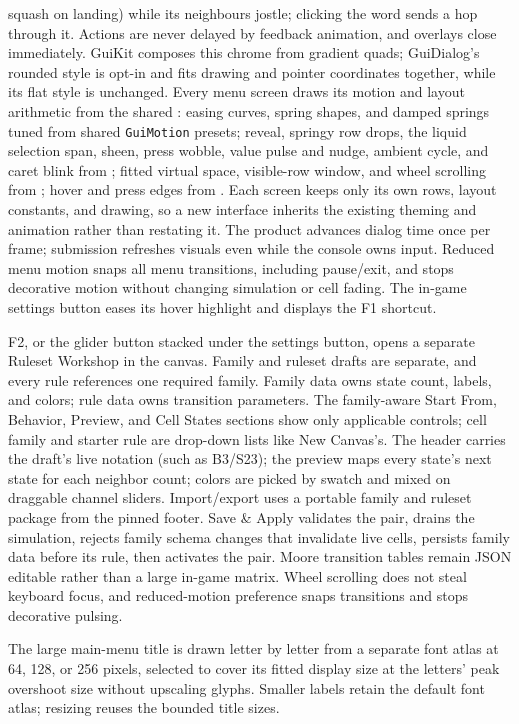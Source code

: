squash on landing) while its neighbours jostle; clicking the word sends a hop
through it.
Actions are never delayed by feedback animation, and overlays close
immediately. GuiKit composes this chrome from  gradient
quads; GuiDialog's rounded style is opt-in and fits drawing and pointer
coordinates together, while its flat style is unchanged. Every menu screen
draws its motion and layout arithmetic from the shared
: easing curves, spring shapes, and damped springs
tuned from shared \texttt{GuiMotion} presets; reveal, springy row drops, the
liquid selection span, sheen, press wobble, value pulse and nudge, ambient
cycle, and caret blink from ; fitted virtual space,
visible-row window, and wheel scrolling from ; hover
and press edges from . Each screen keeps only its
own rows, layout constants, and drawing, so a new interface inherits the
existing theming and animation rather than restating it. The product advances dialog
time once per frame; submission refreshes visuals even while the console owns
input. Reduced menu motion snaps all menu transitions, including pause/exit,
and stops decorative motion without changing simulation or cell fading. The in-game
settings button eases its hover highlight and displays the F1 shortcut.

F2, or the glider button stacked under the settings button, opens a separate
Ruleset Workshop in the canvas. Family and ruleset drafts are separate, and
every rule references one required family. Family data owns state count,
labels, and colors; rule data owns transition parameters. The family-aware
Start From, Behavior, Preview, and Cell States sections show only applicable
controls; cell family and starter rule are drop-down lists like New Canvas's. The header carries the draft's live notation (such as B3/S23); the
preview maps every state's next state for each neighbor count; colors are
picked by swatch and mixed on draggable channel sliders. Import/export uses a
portable family and ruleset package from the pinned footer. Save \& Apply validates the pair, drains the simulation,
rejects family schema changes that invalidate live cells, persists family data
before its rule, then activates the pair. Moore transition tables remain JSON
editable rather than a large in-game matrix. Wheel scrolling does not steal
keyboard focus, and reduced-motion preference snaps transitions and stops
decorative pulsing.

The large main-menu title is drawn letter by letter from a separate font atlas
at 64, 128, or 256 pixels, selected to cover its fitted display size at the
letters' peak overshoot size without upscaling glyphs. Smaller labels retain
the default font atlas; resizing reuses the bounded title sizes.

